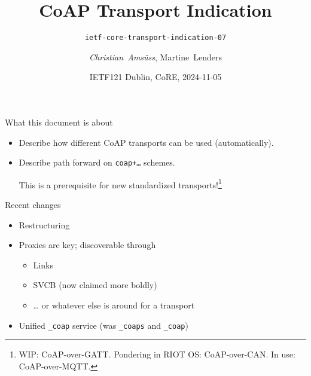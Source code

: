 

\title{CoAP Transport Indication}
\subtitle{\texttt{ietf-core-transport-indication-07}}
\author{\textit{Christian~Amsüss}, Martine~Lenders}
\date{IETF121 Dublin, CoRE, 2024-11-05}



\frame{\titlepage}

\begin{frame}{What this document is about}\Large
    \begin{itemize}
        \item Describe how different CoAP transports can be used (automatically).
        \item Describe path forward on \texttt{coap+…} schemes.

            \bigskip

            This is a prerequisite for new standardized transports!\footnote{WIP: CoAP-over-GATT. Pondering in RIOT OS: CoAP-over-CAN. In use: CoAP-over-MQTT.}
    \end{itemize}
\end{frame}

\begin{frame}{Recent changes}\Large
    \begin{itemize}
        \item Restructuring
        \item Proxies are key; discoverable through
            \begin{itemize}\Large
                \item Links
                \item SVCB (now claimed more boldly)
                \item … or whatever else is around for a transport
            \end{itemize}
        \item Unified \texttt{\_coap} service (was \texttt{\_coaps} and \texttt{\_coap})
    \end{itemize}
\end{frame}

